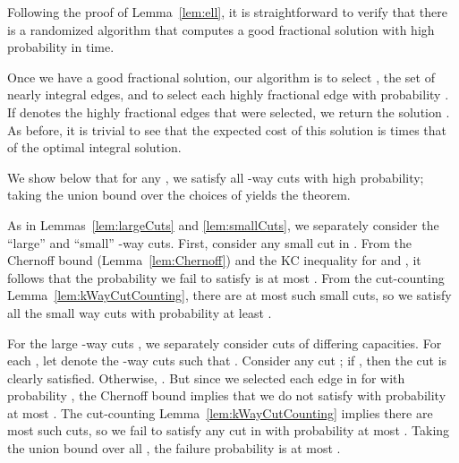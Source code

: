 \documentclass[11pt]{article}
\newcounter{thm0Rcopies}
\newcounter{thm_saved}
\begin{document}
Following the proof of Lemma~\ref{lem:ell}, it is straightforward to
verify that there is a randomized algorithm that computes a good
fractional solution with high probability in  time.

Once we have a good fractional solution, our algorithm is to select
, the set of nearly integral edges, and to select each highly
fractional edge  with probability . If  denotes the highly fractional edges that were
selected, we return the solution . As before, it is
trivial to see that the expected cost of this solution is  times that of the optimal integral solution. 

We show below that for any , we satisfy all -way cuts
with high probability; taking the union bound over the  choices
of  yields the theorem. 

As in Lemmas~\ref{lem:largeCuts} and \ref{lem:smallCuts}, we
separately consider the ``large'' and ``small'' -way cuts.
First, consider any small cut  in . From the Chernoff bound
(Lemma~\ref{lem:Chernoff}) and the KC inequality for  and ,
it follows that the probability we fail to satisfy  is at most
. From the cut-counting Lemma~\ref{lem:kWayCutCounting},
there are at most  such small cuts, so we satisfy all
the small  way cuts with probability at least
.

For the large -way cuts , we separately consider cuts of
differing capacities. For each , let  denote the
-way cuts  such that . Consider any cut ; if , then the cut  is clearly satisfied. Otherwise,
. But since we selected
each edge  in  for  with probability
, the Chernoff bound implies that we do not
satisfy  with probability at most .  The
cut-counting Lemma~\ref{lem:kWayCutCounting} implies there are most
 such cuts, so we fail to satisfy any cut
in  with probability at most . Taking the union
bound over all , the failure probability is at most .
\end{document}
